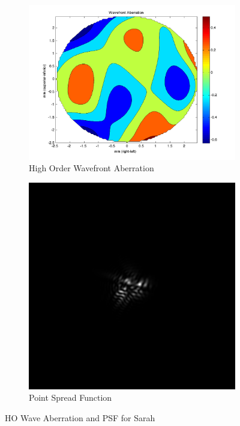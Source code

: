 \documentclass{article}
\begin{document}
\begin{figure}[H]
\begin{subfigure}{.5\textwidth}
  \centering
  \includegraphics[width=1\linewidth]{Sarah_WFA.png}
  \caption{High Order Wavefront Aberration}
  \label{fig:sarahhowa}
\end{subfigure}%
\begin{subfigure}{.5\textwidth}
  \centering
  \includegraphics[width=.8\linewidth]{Sarah_PSF.png}
  \caption{Point Spread Function}
  \label{fig:sarahpsf}
\end{subfigure}
\caption{HO Wave Aberration and PSF for Sarah}
\label{fig:sarah}
\end{figure}
\end{document}
